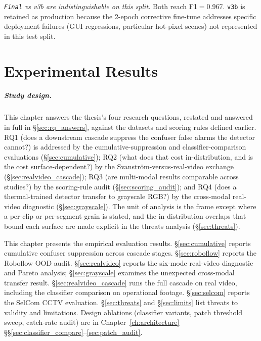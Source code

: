 \documentclass[12pt,a4paper,oneside,openright]{book}
\begin{document}
\emph{\texttt{Final} vs v3b are indistinguishable on this split.} Both reach F1$=$0.967. \texttt{v3b} is retained as production because the 2-epoch corrective fine-tune addresses specific deployment failures (GUI regressions, particular hot-pixel scenes) not represented in this test split.

\chapter{Experimental Results}
\label{ch:experiments}

\paragraph{Study design.}
This chapter answers the thesis's four research questions, restated and answered in full in \S\ref{sec:rq_answers}, against the datasets and scoring rules defined earlier. RQ1 (does a downstream cascade suppress the confuser false alarms the detector cannot?) is addressed by the cumulative-suppression and classifier-comparison evaluations (\S\ref{sec:cumulative}); RQ2 (what does that cost in-distribution, and is the cost surface-dependent?) by the Svanstr\"om-versus-real-video exchange (\S\ref{sec:realvideo_cascade}); RQ3 (are multi-modal results comparable across studies?) by the scoring-rule audit (\S\ref{sec:scoring_audit}); and RQ4 (does a thermal-trained detector transfer to grayscale RGB?) by the cross-modal real-video diagnostic (\S\ref{sec:grayscale}). The unit of analysis is the frame except where a per-clip or per-segment grain is stated, and the in-distribution overlaps that bound each surface are made explicit in the threats analysis (\S\ref{sec:threats}).

This chapter presents the empirical evaluation results. \S\ref{sec:cumulative} reports cumulative confuser suppression across cascade stages. \S\ref{sec:roboflow} reports the Roboflow OOD audit. \S\ref{sec:realvideo} reports the six-mode real-video diagnostic and Pareto analysis; \S\ref{sec:grayscale} examines the unexpected cross-modal transfer result. \S\ref{sec:realvideo_cascade} runs the full cascade on real video, including the classifier comparison on operational footage. \S\ref{sec:selcom} reports the SelCom CCTV evaluation. \S\ref{sec:threats} and \S\ref{sec:limits} list threats to validity and limitations. Design ablations (classifier variants, patch threshold sweep, catch-rate audit) are in Chapter~\ref{ch:architecture} \S\S\ref{sec:classifier_compare}--\ref{sec:patch_audit}.
\end{document}
